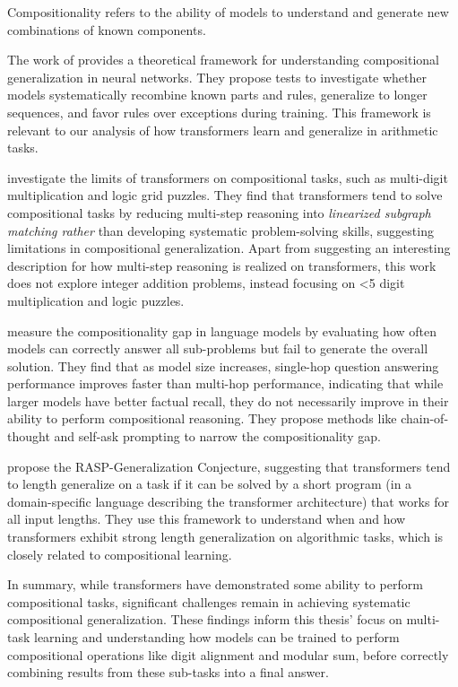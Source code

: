 Compositionality refers to the ability of models to understand and generate new combinations of known components.

The work of \cite{hupkes_compositionality_2020} provides a theoretical framework for understanding compositional generalization in neural networks. They propose tests to investigate whether models systematically recombine known parts and rules, generalize to longer sequences, and favor rules over exceptions during training. This framework is relevant to our analysis of how transformers learn and generalize in arithmetic tasks.

\cite{dziri_faith_2023} investigate the limits of transformers on compositional tasks, such as multi-digit multiplication and logic grid puzzles. They find that transformers tend to solve compositional tasks by reducing multi-step reasoning into \emph{linearized subgraph matching rather} than developing systematic problem-solving skills, suggesting limitations in compositional generalization. Apart from suggesting an interesting description for how multi-step reasoning is realized on transformers, this work does not explore integer addition problems, instead focusing on <5 digit multiplication and logic puzzles.

\cite{press_measuring_2023} measure the compositionality gap in language models by evaluating how often models can correctly answer all sub-problems but fail to generate the overall solution. They find that as model size increases, single-hop question answering performance improves faster than multi-hop performance, indicating that while larger models have better factual recall, they do not necessarily improve in their ability to perform compositional reasoning. They propose methods like chain-of-thought and self-ask prompting to narrow the compositionality gap.

\cite{zhou_what_2023} propose the RASP-Generalization Conjecture, suggesting that transformers tend to length generalize on a task if it can be solved by a short program (in a domain-specific language describing the transformer architecture) that works for all input lengths. They use this framework to understand when and how transformers exhibit strong length generalization on algorithmic tasks, which is closely related to compositional learning.

In summary, while transformers have demonstrated some ability to perform compositional tasks, significant challenges remain in achieving systematic compositional generalization. These findings inform this thesis' focus on multi-task learning and understanding how models can be trained to perform compositional operations like digit alignment and modular sum, before correctly combining results from these sub-tasks into a final answer.

